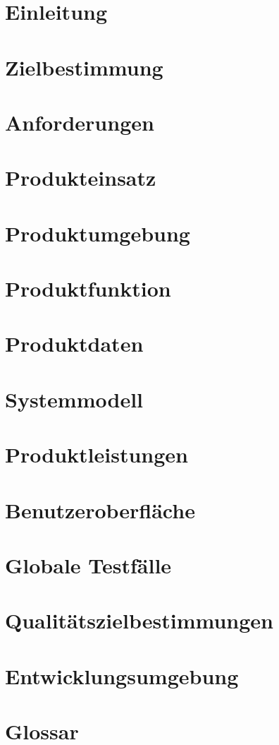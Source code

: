 

	\maketitle
	\setcounter{tocdepth}{1}
	\tableofcontents
	\chapter{Einleitung}
		
	\chapter{Zielbestimmung}
		
	\chapter{Anforderungen}
		
	\chapter{Produkteinsatz}
		
	\chapter{Produktumgebung}
		
	\chapter{Produktfunktion}
		
	\chapter{Produktdaten}
		
	\chapter{Systemmodell}
		
	\chapter{Produktleistungen}
		
	\chapter{Benutzeroberfläche}
		
	\chapter{Globale Testfälle}
		
	\chapter{Qualitätszielbestimmungen}
		
	\chapter{Entwicklungsumgebung}
		
	\chapter{Glossar}
		
